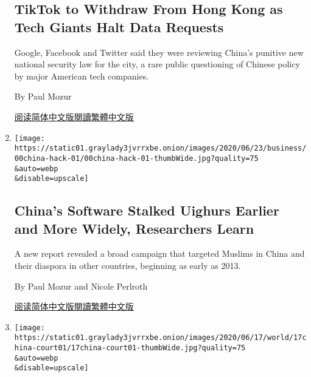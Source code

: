 \begin{enumerate}
  \hypertarget{tiktok-to-withdraw-from-hong-kong-as-tech-giants-halt-data-requests}{%
  \subsection{TikTok to Withdraw From Hong Kong as Tech Giants Halt Data
  Requests}\label{tiktok-to-withdraw-from-hong-kong-as-tech-giants-halt-data-requests}}

  Google, Facebook and Twitter said they were reviewing China's punitive
  new national security law for the city, a rare public questioning of
  Chinese policy by major American tech companies.

  By Paul Mozur

  \href{https://cn.nytimes3xbfgragh.onion/technology/20200707/facebook-temporarily-stops-hong-kong-data-requests/}{阅读简体中文版}\href{https://cn.nytimes3xbfgragh.onion/technology/20200707/facebook-temporarily-stops-hong-kong-data-requests/zh-hant/}{閱讀繁體中文版}
\item
  \href{/2020/07/01/technology/china-uighurs-hackers-malware-hackers-smartphones.html}{}

  \texttt{[image: https://static01.graylady3jvrrxbe.onion/images/2020/06/23/business/00china-hack-01/00china-hack-01-thumbWide.jpg?quality=75\\\&auto=webp\\\&disable=upscale]}

  \hypertarget{chinas-software-stalked-uighurs-earlier-and-more-widely-researchers-learn}{%
  \subsection{China's Software Stalked Uighurs Earlier and More Widely,
  Researchers
  Learn}\label{chinas-software-stalked-uighurs-earlier-and-more-widely-researchers-learn}}

  A new report revealed a broad campaign that targeted Muslims in China
  and their diaspora in other countries, beginning as early as 2013.

  By Paul Mozur and Nicole Perlroth

  \href{https://cn.nytimes3xbfgragh.onion/technology/20200702/china-uighurs-hackers-malware-hackers-smartphones/}{阅读简体中文版}\href{https://cn.nytimes3xbfgragh.onion/technology/20200702/china-uighurs-hackers-malware-hackers-smartphones/zh}{閱讀繁體中文版}
\item
  \href{/2020/06/17/world/asia/china-wang-zhenhua-sentence.html}{}

  \texttt{[image: https://static01.graylady3jvrrxbe.onion/images/2020/06/17/world/17china-court01/17china-court01-thumbWide.jpg?quality=75\\\&auto=webp\\\&disable=upscale]}


\end{enumerate}
